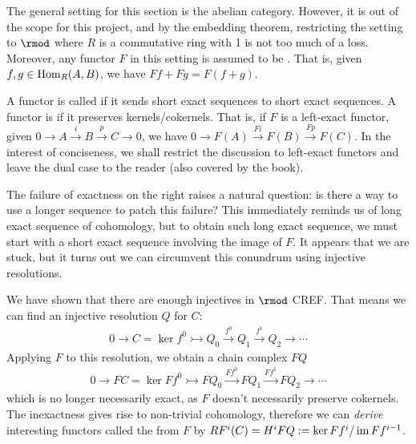 \documentclass[12pt,class=article,crop=false]{standalone}
\begin{document}
The general setting for this section is the abelian category. However, it is out of the scope for this project, and by the embedding theorem, restricting the setting to $ \rmod$ where $ R$ is a commutative ring with 1 is not too much of a loss. Moreover, any functor $ F$ in this setting is assumed to be . That is, given $ f,g \in \operatorname{Hom}_R( A, B)$, we have $ Ff+Fg = F(f+g)$.

A functor is called  if it sends short exact sequences to short exact sequences. A functor is  if it preserves kernels/cokernels. That is, if $ F$ is a left-exact functor, given $ 0 \to A \xrightarrow{ i} B \xrightarrow{ p}C \to 0$, we have $0 \to F(A) \xrightarrow{ Fi} F(B) \xrightarrow{ Fp} F(C)$. In the interest of conciseness, we shall restrict the discussion to left-exact functors and leave the dual case to the reader (also covered by the book).

The failure of exactness on the right raises a natural question: is there a way to use a longer sequence to patch this failure? This immediately reminds us of long exact sequence of cohomology, but to obtain such long exact sequence, we must start with a short exact sequence involving the image of $ F$. It appears that we are stuck, but it turns out we can circumvent this conundrum using injective resolutions.

We have shown that there are enough injectives in $ \rmod$ CREF. That means we can find an injective resolution $ Q$ for $ C$:
 \begin{align*}
	 0 \to C = \ker f^0 \rightarrowtail Q_0 \xrightarrow{ f^0} Q_{1} \xrightarrow{ f^1} Q_{2} \to \cdots    
\end{align*}
Applying $ F$ to this resolution, we obtain a chain complex $ FQ$
\begin{align*}
	0 \to FC = \ker F f^0 \rightarrowtail FQ_0 \xrightarrow{ Ff^0} F Q_{1} \xrightarrow{ F f^1} FQ_{2} \to \cdots    
\end{align*}
which is no longer necessarily exact, as $ F$ doesn't necessarily preserve cokernels. The inexactness gives rise to non-trivial cohomology, therefore we can \emph{derive} interesting functors called the  from $ F$ by $ RF^{i}(C) = H^{i}FQ := \ker Ff^i / \operatorname{im} Ff^{i-1}$.
\end{document}
